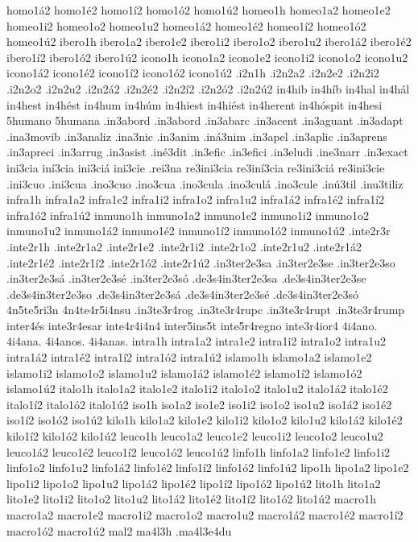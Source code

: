 {homo1á2 homo1é2 homo1í2 homo1ó2 homo1ú2
homeo1h
homeo1a2 homeo1e2 homeo1i2 homeo1o2 homeo1u2
homeo1á2 homeo1é2 homeo1í2 homeo1ó2 homeo1ú2
ibero1h
ibero1a2 ibero1e2 ibero1i2 ibero1o2 ibero1u2
ibero1á2 ibero1é2 ibero1í2 ibero1ó2 ibero1ú2
icono1h
icono1a2 icono1e2 icono1i2 icono1o2 icono1u2
icono1á2 icono1é2 icono1í2 icono1ó2 icono1ú2
.i2n1h
.i2n2a2 .i2n2e2 .i2n2i2 .i2n2o2 .i2n2u2
.i2n2á2 .i2n2é2 .i2n2í2 .i2n2ó2 .i2n2ú2
in4hib
in4híb
in4hal
in4hál
in4hest
in4hést
in4hum
in4húm
in4hiest
in4hiést
in4herent
in4hóspit
in4hesi
5humano
5humana
.in3abord
.in3abord
.in3abarc
.in3acent
.in3aguant
.in3adapt
.ina3movib
.in3analiz
.ina3nic
.in3anim
.iná3nim
.in3apel
.in3aplic
.in3aprens
.in3apreci
.in3arrug
.in3asist
.iné3dit
.in3efic
.in3efici
.in3eludi
.ine3narr
.in3exact
ini3cia
iní3cia
ini3ciá
ini3cie
.rei3na
re3ini3cia
re3iní3cia
re3ini3ciá
re3ini3cie
.ini3cuo
.ini3cua
.ino3cuo
.ino3cua
.ino3cula
.ino3culá
.ino3cule
.inú3til
.inu3tiliz
infra1h
infra1a2 infra1e2 infra1i2 infra1o2 infra1u2
infra1á2 infra1é2 infra1í2 infra1ó2 infra1ú2
inmuno1h
inmuno1a2 inmuno1e2 inmuno1i2 inmuno1o2 inmuno1u2
inmuno1á2 inmuno1é2 inmuno1í2 inmuno1ó2 inmuno1ú2
.inte2r3r
.inte2r1h
.inte2r1a2 .inte2r1e2 .inte2r1i2 .inte2r1o2 .inte2r1u2
.inte2r1á2 .inte2r1é2 .inte2r1í2 .inte2r1ó2 .inte2r1ú2
.in3ter2e3sa
.in3ter2e3se
.in3ter2e3so
.in3ter2e3sá
.in3ter2e3sé
.in3ter2e3só
.de3s4in3ter2e3sa
.de3s4in3ter2e3se
.de3s4in3ter2e3so
.de3s4in3ter2e3sá
.de3s4in3ter2e3sé
.de3s4in3ter2e3só
4n5te5ri3n
4n4te4r5i4nsu
.in3te3r4rog
.in3te3r4rupc
.in3te3r4rupt
.in3te3r4rump
inter4és
inte3r4esar
inte4r4i4n4
inter5ins5t
inte5r4regno
inte3r4ior4
4i4ano.
4i4ana.
4i4anos.
4i4anas.
intra1h
intra1a2 intra1e2 intra1i2 intra1o2 intra1u2
intra1á2 intra1é2 intra1í2 intra1ó2 intra1ú2
islamo1h
islamo1a2 islamo1e2 islamo1i2 islamo1o2 islamo1u2
islamo1á2 islamo1é2 islamo1í2 islamo1ó2 islamo1ú2
italo1h
italo1a2 italo1e2 italo1i2 italo1o2 italo1u2
italo1á2 italo1é2 italo1í2 italo1ó2 italo1ú2
iso1h
iso1a2 iso1e2 iso1i2 iso1o2 iso1u2
iso1á2 iso1é2 iso1í2 iso1ó2 iso1ú2
kilo1h
kilo1a2 kilo1e2 kilo1i2 kilo1o2 kilo1u2
kilo1á2 kilo1é2 kilo1í2 kilo1ó2 kilo1ú2
leuco1h
leuco1a2 leuco1e2 leuco1i2 leuco1o2 leuco1u2
leuco1á2 leuco1é2 leuco1í2 leuco1ó2 leuco1ú2
linfo1h
linfo1a2 linfo1e2 linfo1i2 linfo1o2 linfo1u2
linfo1á2 linfo1é2 linfo1í2 linfo1ó2 linfo1ú2
lipo1h
lipo1a2 lipo1e2 lipo1i2 lipo1o2 lipo1u2
lipo1á2 lipo1é2 lipo1í2 lipo1ó2 lipo1ú2
lito1h
lito1a2 lito1e2 lito1i2 lito1o2 lito1u2
lito1á2 lito1é2 lito1í2 lito1ó2 lito1ú2
macro1h
macro1a2 macro1e2 macro1i2 macro1o2 macro1u2
macro1á2 macro1é2 macro1í2 macro1ó2 macro1ú2
mal2
ma4l3h
.ma4l3e4du
}
